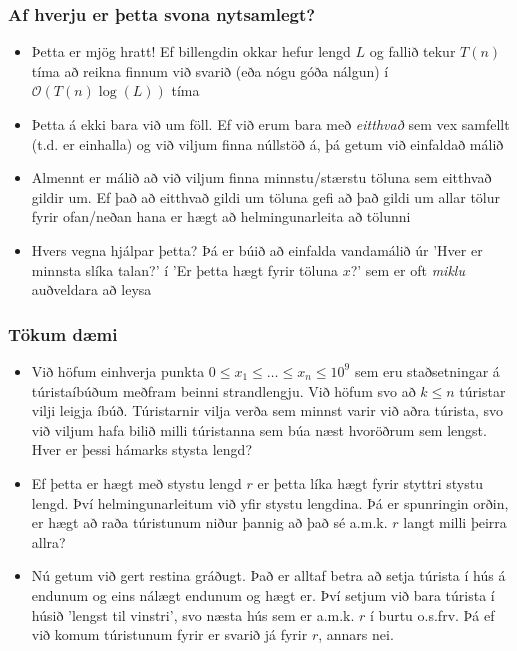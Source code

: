 \documentclass{beamer}
\begin{document}
\begin{frame}
\frametitle{Af hverju er þetta svona nytsamlegt?}

\begin{itemize}

\item<1-> Þetta er mjög hratt! Ef billengdin okkar hefur lengd $L$ og fallið tekur $T(n)$ tíma að reikna finnum við svarið (eða nógu góða nálgun) í $\mathcal{O}(T(n)\log(L))$ tíma

\item<2-> Þetta á ekki bara við um föll. Ef við erum bara með \textit{eitthvað} sem vex samfellt (t.d. er einhalla) og við viljum finna núllstöð á, þá getum við einfaldað málið

\item<3-> Almennt er málið að við viljum finna minnstu/stærstu töluna sem eitthvað gildir um. Ef það að eitthvað gildi um töluna gefi að það gildi um allar tölur fyrir ofan/neðan hana er hægt að helmingunarleita að tölunni

\item<4-> Hvers vegna hjálpar þetta? Þá er búið að einfalda vandamálið úr 'Hver er minnsta slíka talan?' í 'Er þetta hægt fyrir töluna $x$?' sem er oft \textit{miklu} auðveldara að leysa

\end{itemize}

\end{frame}

\begin{frame}
\frametitle{Tökum dæmi}

\begin{itemize}

\item<1-> Við höfum einhverja punkta $0\leq x_1\leq\dots\leq x_n\leq 10^9$ sem eru staðsetningar á túristaíbúðum meðfram beinni strandlengju. Við höfum svo að $k \leq n$ túristar vilji leigja íbúð. Túristarnir vilja verða sem minnst varir við aðra túrista, svo við viljum hafa bilið milli túristanna sem búa næst hvoröðrum sem lengst. Hver er þessi hámarks stysta lengd?

\item<2-> Ef þetta er hægt með stystu lengd $r$ er þetta líka hægt fyrir styttri stystu lengd. Því helmingunarleitum við yfir stystu lengdina. Þá er spunringin orðin, er hægt að raða túristunum niður þannig að það sé a.m.k. $r$ langt milli þeirra allra?

\item<3-> Nú getum við gert restina gráðugt. Það er alltaf betra að setja túrista í hús á endunum og eins nálægt endunum og hægt er. Því setjum við bara túrista í húsið 'lengst til vinstri', svo næsta hús sem er a.m.k. $r$ í burtu o.s.frv. Þá ef við komum túristunum fyrir er svarið já fyrir $r$, annars nei. 

\end{itemize}

\end{frame}
\end{document}
